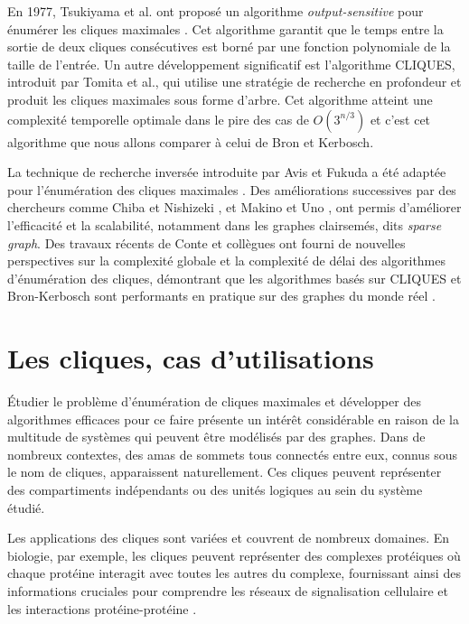 \documentclass[12pt,a4paper]{article}
\begin{document}
En 1977, Tsukiyama et al. ont proposé un algorithme \emph{output-sensitive} pour énumérer les cliques maximales \cite{tsukiyama1977new}. Cet algorithme garantit que le temps entre la sortie de deux cliques consécutives est borné par une fonction polynomiale de la taille de l'entrée. Un autre développement significatif est l'algorithme CLIQUES, introduit par Tomita et al., qui utilise une stratégie de recherche en profondeur et produit les cliques maximales sous forme d'arbre. Cet algorithme atteint une complexité temporelle optimale dans le pire des cas de \(O(3^{n/3})\) et c'est cet algorithme que nous allons comparer à celui de Bron et Kerbosch.

La technique de recherche inversée introduite par Avis et Fukuda a été adaptée pour l'énumération des cliques maximales \cite{avis1996reverse}. Des améliorations successives par des chercheurs comme Chiba et Nishizeki \cite{chiba1985arboricity}, et Makino et Uno \cite{makino2004new}, ont permis d'améliorer l'efficacité et la scalabilité, notamment dans les graphes clairsemés, dits \emph{sparse graph}. Des travaux récents de Conte et collègues ont fourni de nouvelles perspectives sur la complexité globale et la complexité de délai des algorithmes d'énumération des cliques, démontrant que les algorithmes basés sur CLIQUES et Bron-Kerbosch sont performants en pratique sur des graphes du monde réel \cite{conte2022overall}.

\section{Les cliques, cas d'utilisations}%
\label{sec:usecase}

Étudier le problème d'énumération de cliques maximales et développer des algorithmes efficaces pour ce faire présente un intérêt considérable en raison de la multitude de systèmes qui peuvent être modélisés par des graphes. Dans de nombreux contextes, des amas de sommets tous connectés entre eux, connus sous le nom de cliques, apparaissent naturellement. Ces cliques peuvent représenter des compartiments indépendants ou des unités logiques au sein du système étudié.

Les applications des cliques sont variées et couvrent de nombreux domaines. En biologie, par exemple, les cliques peuvent représenter des complexes protéiques où chaque protéine interagit avec toutes les autres du complexe, fournissant ainsi des informations cruciales pour comprendre les réseaux de signalisation cellulaire et les interactions protéine-protéine \cite{PAVLOU2016305}.
\end{document}
